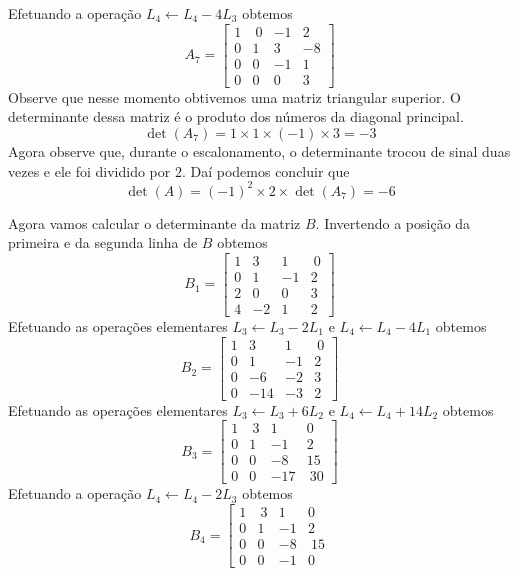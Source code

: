 \begin{solution}
Efetuando a operação $L_4 \leftarrow L_4 - 4L_3$ obtemos
$$A_7 = \left[ \begin{array}{rrrr}
 1 & \ 0 &  -1 &   2 \\  
 0 &   1 &   3 &  -8 \\
 0 &   0 &  -1 &   1 \\
 0 &   0 &   0 &   3
\end{array} \right]$$
Observe que nesse momento obtivemos uma matriz triangular superior. O determinante dessa matriz é o produto dos números da diagonal principal.
$$\det(A_7) = 1 \times 1 \times (-1) \times 3 = -3$$
Agora observe que, durante o escalonamento, o determinante trocou de sinal duas vezes e ele foi dividido por $2$. 
Daí podemos concluir que 
$$\det(A) = (-1)^2 \times 2 \times \det(A_7) = -6$$

\bigskip
Agora vamos calcular o determinante da matriz $B$.
Invertendo a posição da primeira e da segunda linha de $B$ obtemos
$$B_1 = \left[ \begin{array}{rrrr}
 1 &  3 &  1 &  \ 0 \\
 0 &  1 & -1 &    2 \\
 2 &  0 &  0 &    3 \\  
 4 & -2 &  1 &    2
\end{array} \right]$$
Efetuando as operações elementares $L_3 \leftarrow L_3 - 2L_1$ e $L_4 \leftarrow L_4 - 4L_1$ obtemos
$$B_2 = \left[ \begin{array}{rrrr}
 1 &    3 &   1 &  \ 0 \\
 0 &    1 &  -1 &    2 \\
 0 &   -6 &  -2 &    3 \\  
 0 &  -14 &  -3 &    2
\end{array} \right]$$
Efetuando as operações elementares $L_3 \leftarrow L_3 + 6L_2$ e $L_4 \leftarrow L_4 + 14L_2$ obtemos
$$B_3 = \left[ \begin{array}{rrrr}
 1 &  \ 3 &    1 &     0 \\
 0 &    1 &   -1 &     2 \\
 0 &    0 &   -8 &    15 \\  
 0 &    0 &  -17 &  \ 30
\end{array} \right]$$
Efetuando a operação $L_4 \leftarrow L_4 - 2L_3$ obtemos
$$B_4 = \left[ \begin{array}{rrrr}
 1 &  \ 3 &    1 &     0 \\
 0 &    1 &   -1 &     2 \\
 0 &    0 &   -8 &  \ 15 \\  
 0 &    0 &   -1 &     0

\end{array}$$
\end{solution}
